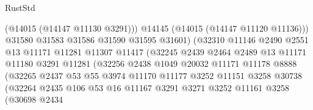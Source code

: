 \begin{lexlean}{RustStd}
\begin{coremodule}
                                      (@14015 (@14147 @11130 @3291)))
                                    @14145
                                    (@14015 (@14147 @11120 @11136)))
                                  @31580
                                  @31583
                                  @31586
                                  @31590
                                  @31595
                                  @31601)
                                (@32310
                                  @11146
                                  @2490
                                  @2551
                                  @13
                                  @11171
                                  @11281
                                  @11307
                                  @11417
                                  (@32245
                                    @2439
                                    @2464
                                    @2489
                                    @13
                                    @11171
                                    @11180
                                    @3291
                                    @11281
                                    (@32256
                                      @2438
                                      @1049
                                      @20032
                                      @11171
                                      @11178
                                      @8888
                                      (@32265
                                        @2437
                                        @53
                                        @55
                                        @3974
                                        @11170
                                        @11177
                                        @3252
                                        @11151
                                        @3258
                                        @30738
                                        (@32264
                                          @2435
                                          @106
                                          @53
                                          @16
                                          @11167
                                          @3291
                                          @3271
                                          @3252
                                          @11161
                                          @3258
                                          (@30698
                                            @2434

\end{coremodule}
\end{lexlean}
